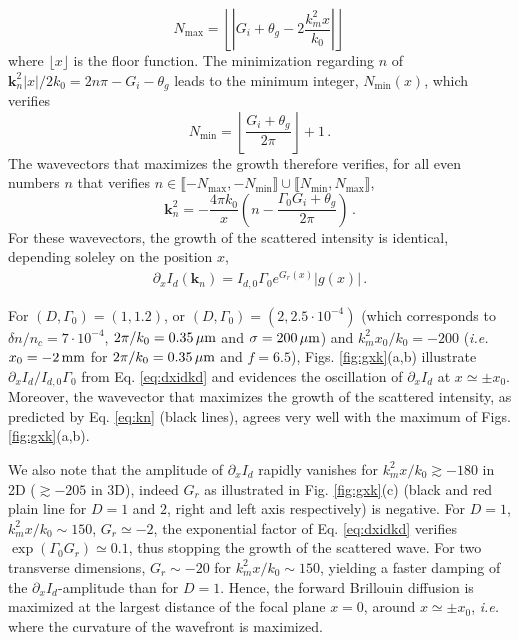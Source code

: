 \documentclass[
 reprint,
 amsmath,amssymb,
 aps,
]{revtex4-1}
\begin{document}
\begin{equation}\label{eq:nmax}
    N_\mathrm{max} =\left\lfloor \left\vert  G_i +\theta_g-2\frac{k_m^2  x   }{k_0}  \right\vert \right\rfloor \,  
\end{equation}
where $\lfloor x  \rfloor$ is the floor function.
The minimization regarding $n$ of  $\mathbf{k}_n^2 \vert x\vert  /2k_0 = 2n\pi-G_i- \theta_g$ leads to  the minimum integer, $N_\mathrm{min}(x)$, which verifies
\begin{equation}\label{eq:nmin}
    N_\mathrm{min} =  \left\lfloor\frac{ G_i+ \theta_g}{2\pi}\right\rfloor+1\, .
\end{equation}
The wavevectors that maximizes the growth therefore verifies,
for all even numbers $n$ that verifies $n\in  \llbracket -N_\mathrm{max} ,-N_\mathrm{min} \rrbracket   \cup \llbracket N_\mathrm{min} ,N_\mathrm{max} \rrbracket$, 
\begin{equation}\label{eq:kn}
    \mathbf{k}_n^2 =-\frac{4\pi k_0}{x} \left(n- \frac{\Gamma_0 G_i +\theta_g}{2\pi}   \right) \, .
\end{equation}
For these wavevectors, the growth of the scattered intensity is identical, depending soleley on the position $x$, 
\begin{align}
\partial_x I_d(\mathbf{k}_n) = I_{d,0}\Gamma_0   e^{ G_r(x)} \vert g(x) \vert \, . \label{eq:dxidkn}
\end{align} 

For $(D,\Gamma_0)=(1,1.2)$,   or $(D,\Gamma_0)=(2,2.5\cdot 10^{-4} )$ (which corresponds to $\delta n/n_c =7\cdot 10^{-4}$, $2\pi/k_0=0.35\,\rm\mu m$ and $\sigma=200\,\rm\mu m$) and $k_m^2x_0/k_0= -200$ (\emph{i.e.} $x_0=-2 \,\rm mm$ for $2\pi/k_0=0.35\,\rm\mu m$ and $f=6.5$), Figs. \ref{fig:gxk}(a,b) illustrate $\partial_x I_d / I_{d,0} \Gamma_0$ from Eq. \eqref{eq:dxidkd} and evidences the oscillation of $\partial_x I_d$ at $x\simeq \pm x_0$. Moreover, the wavevector that maximizes the growth of the scattered intensity, as predicted by Eq. \eqref{eq:kn} (black lines), agrees very well with the maximum of Figs. \ref{fig:gxk}(a,b). 

We also note that the amplitude of $\partial_x I_d$ rapidly vanishes for $k_m^2 x/k_0\gtrsim -180$ in 2D ($\gtrsim -205$ in 3D), indeed $G_r$  as illustrated in  Fig. \ref{fig:gxk}(c) (black and red plain line for $D=1$ and $2$,  right and left axis respectively) is negative. For $D=1$,  $k_m^2 x/k_0\sim 150$, $G_r\simeq -2$,  the exponential factor of Eq. \eqref{eq:dxidkd} verifies $\exp(\Gamma_0G_r) \simeq 0.1$, thus stopping the growth of the scattered wave.  For two transverse dimensions, $G_r\sim -20 $ for $k_m^2 x/k_0\sim 150$, yielding a faster damping of the $\partial_x I_d$-amplitude than for $D=1$.
Hence, the forward Brillouin diffusion is maximized at the largest distance  of the focal plane $x=0$, around $x\simeq \pm x_0$, \emph{i.e.}  where the curvature of the wavefront is maximized.
\end{document}
